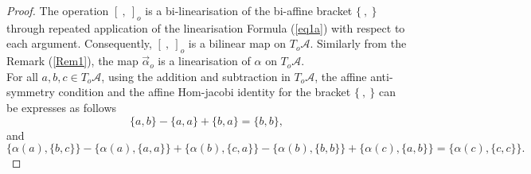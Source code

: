 \documentclass[14pt]{article}
\theoremstyle{Definition}
\theoremstyle{remark}
\begin{document}
\begin{proof}
The operation $[~,~]_{o}$ is a bi-linearisation of the bi-affine bracket $\{~,~\}$ through repeated application of the linearisation Formula (\ref{eq1a}) with respect to each argument. Consequently, $[~,~]_{o}$ is a bilinear map on $T_{o}\mathcal{A}$. Similarly from the Remark (\ref{Rem1}), the map $\overrightarrow{\alpha}_{o}$ is a linearisation of $\alpha$ on $T_{o}\mathcal{A}$.\\
For all $a,b,c\in T_{o}\mathcal{A}$, using the addition and subtraction in $T_{o}\mathcal{A}$, the affine anti-symmetry condition and the affine Hom-jacobi identity for the bracket $\{~,~\}$ can be expresses as follows 
\begin{equation}\label{eq6}
\{a,b\}-\{a,a\}+\{b,a\}=\{b,b\},
\end{equation}
and
\begin{equation}\label{eq7}
\{\alpha(a),\{b,c\}\}-\{\alpha(a),\{a,a\}\}+\{\alpha(b),\{c,a\}\}-\{\alpha(b),\{b,b\}\}+\{\alpha(c),\{a,b\}\}=\{\alpha(c),\{c,c\}\}.
\end{equation}


\end{proof}
\end{document}

